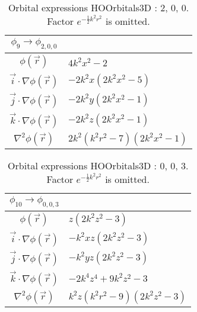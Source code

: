 \begin{table}
\begin{center}
\begin{tabular}{c|l}
$\phi_{9} \rightarrow \phi_{2, 0, 0}$\\
\hline
$\phi(\vec r)$ & $4 k^{2} x^{2} -2$\\
\hline
$\vec i\cdot \nabla \phi(\vec r)$ & $- 2 k^{2} x \left(2 k^{2} x^{2} -5\right)$\\
$\vec j\cdot \nabla \phi(\vec r)$ & $- 2 k^{2} y \left(2 k^{2} x^{2} -1\right)$\\
$\vec k\cdot \nabla \phi(\vec r)$ & $- 2 k^{2} z \left(2 k^{2} x^{2} -1\right)$\\
\hline
$\nabla^2 \phi(\vec r)$ & $2 k^{2} \left(k^{2} r^{2} -7\right) \left(2 k^{2} x^{2} -1\right)$\\
\end{tabular}
\caption{Orbital expressions HOOrbitals3D : 2, 0, 0. Factor $e^{- \frac{1}{2} k^{2} r^{2}}$ is omitted.}
\end{center}
\end{table}

\clearpage

\begin{table}
\begin{center}
\begin{tabular}{c|l}
$\phi_{10} \rightarrow \phi_{0, 0, 3}$\\
\hline
$\phi(\vec r)$ & $z \left(2 k^{2} z^{2} -3\right)$\\
\hline
$\vec i\cdot \nabla \phi(\vec r)$ & $- k^{2} x z \left(2 k^{2} z^{2} -3\right)$\\
$\vec j\cdot \nabla \phi(\vec r)$ & $- k^{2} y z \left(2 k^{2} z^{2} -3\right)$\\
$\vec k\cdot \nabla \phi(\vec r)$ & $- 2 k^{4} z^{4} + 9 k^{2} z^{2} -3$\\
\hline
$\nabla^2 \phi(\vec r)$ & $k^{2} z \left(k^{2} r^{2} -9\right) \left(2 k^{2} z^{2} -3\right)$\\
\end{tabular}
\caption{Orbital expressions HOOrbitals3D : 0, 0, 3. Factor $e^{- \frac{1}{2} k^{2} r^{2}}$ is omitted.}
\end{center}
\end{table}


